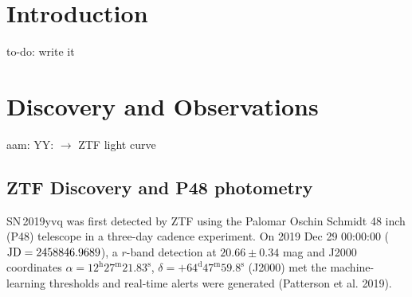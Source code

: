 \documentclass[twocolumn]{aastex63}
\newcommand{\yy}[1]{{\color{blue} YY: {#1}}}
\newcommand{\aam}[1]{{\color{DarkOrange} aam: {#1}}}
\newcommand{\todo}[1]{{\color{magenta} to-do: {#1}}}
\begin{document}

\author{ZTF}

\author{et al.}


\begin{abstract}

\todo{Write the abstract}

\end{abstract}

\keywords{}

\section{Introduction} \label{sec:intro}

\todo{write it}

\section{Discovery and Observations}\label{sec:obs}

\aam{\yy{$\longrightarrow$ ZTF light curve}}
\subsection{ZTF Discovery and P48 photometry}
SN\,2019yvq was first detected by ZTF using the Palomar Oschin Schmidt 48 inch (P48) telescope in a three-day cadence experiment. 
On 2019 Dec 29 00:00:00 (${\rm JD}=2458846.9689$), a $r$-band detection at $20.66\pm0.34$ mag and J2000 coordinates $\alpha = 12^{\mathrm{h}}27^{\mathrm{m}}21.83^{\mathrm{s}}$, $\delta = +64^{\mathrm{d}}47^{\mathrm{m}}59.8^{\mathrm{s}}$ (J2000) met the machine-learning thresholds \citep{Mahabal19} and real-time alerts were generated (Patterson et al. 2019). 
\end{document}
